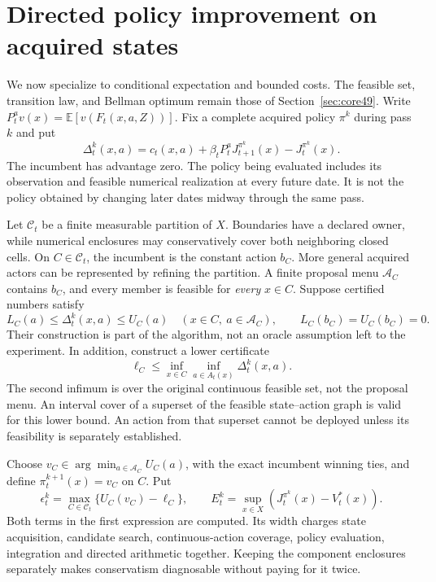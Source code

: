 \section{Directed policy improvement on acquired states}\label{sec:directed53}
We now specialize to conditional expectation and bounded costs. The feasible set, transition law, and Bellman optimum remain those of Section~\ref{sec:core49}. Write $P_t^av(x)=\mathbb E[v(F_t(x,a,Z))]$. Fix a complete acquired policy $\pi^k$ during pass $k$ and put
\begin{equation}\label{eq:advantage53}
 \Delta_t^k(x,a)=c_t(x,a)+\beta_tP_t^aJ_{t+1}^{\pi^k}(x)-J_t^{\pi^k}(x).
\end{equation}
The incumbent has advantage zero. The policy being evaluated includes its observation and feasible numerical realization at every future date. It is not the policy obtained by changing later dates midway through the same pass.

Let $\mathcal C_t$ be a finite measurable partition of $X$. Boundaries have a declared owner, while numerical enclosures may conservatively cover both neighboring closed cells. On $C\in\mathcal C_t$, the incumbent is the constant action $b_C$. More general acquired actors can be represented by refining the partition. A finite proposal menu $\mathcal A_C$ contains $b_C$, and every member is feasible for \emph{every} $x\in C$. Suppose certified numbers satisfy
\begin{equation}\label{eq:directed-enclosure53}
 L_C(a)\le\Delta_t^k(x,a)\le U_C(a)\quad(x\in C,\ a\in\mathcal A_C),
 \qquad L_C(b_C)=U_C(b_C)=0.
\end{equation}
Their construction is part of the algorithm, not an oracle assumption left to the experiment. In addition, construct a lower certificate
\begin{equation}\label{eq:continuous-inf53}
 \ell_C\le\inf_{x\in C}\inf_{a\in A_t(x)}\Delta_t^k(x,a).
\end{equation}
The second infimum is over the original continuous feasible set, not the proposal menu. An interval cover of a superset of the feasible state--action graph is valid for this lower bound. An action from that superset cannot be deployed unless its feasibility is separately established.

Choose $v_C\in\arg\min_{a\in\mathcal A_C}U_C(a)$, with the exact incumbent winning ties, and define $\pi_t^{k+1}(x)=v_C$ on $C$. Put
\begin{equation}\label{eq:epsilon53}
 \epsilon_t^k=\max_{C\in\mathcal C_t}\{U_C(v_C)-\ell_C\},\qquad
 E_t^k=\sup_{x\in X}(J_t^{\pi^k}(x)-V_t^*(x)).
\end{equation}
Both terms in the first expression are computed. Its width charges state acquisition, candidate search, continuous-action coverage, policy evaluation, integration and directed arithmetic together. Keeping the component enclosures separately makes conservatism diagnosable without paying for it twice.

